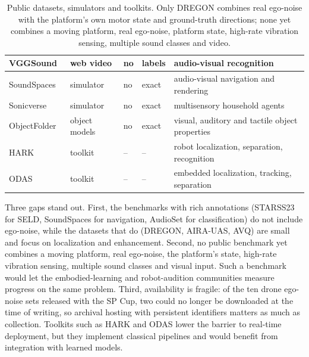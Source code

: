 \begin{table}[t]
\begin{tabular}{@{}L{3.1cm}L{2.0cm}L{1.3cm}L{1.4cm}L{7.6cm}@{}}
VGGSound~\cite{chen2020vggsound} & web video & no & labels & audio-visual recognition \\
\midrule
SoundSpaces~\cite{chen2020soundspaces,chen2022soundspaces2} & simulator & no & exact & audio-visual navigation and rendering \\
Sonicverse~\cite{gao2023sonicverse} & simulator & no & exact & multisensory household agents \\
ObjectFolder~\cite{gao2021objectfolder} & object models & no & exact & visual, auditory and tactile object properties \\
\midrule
HARK~\cite{nakadai2017hark} & toolkit & -- & -- & robot localization, separation, recognition \\
ODAS~\cite{grondin2022odas} & toolkit & -- & -- & embedded localization, tracking, separation \\
\bottomrule
\end{tabular}
\caption{Public datasets, simulators and toolkits. Only DREGON combines real ego-noise with the platform's own motor state and ground-truth directions; none yet combines a moving platform, real ego-noise, platform state, high-rate vibration sensing, multiple sound classes and video.}
\label{tab:datasets}
\end{table}

Three gaps stand out.
First, the benchmarks with rich annotations (STARSS23 for SELD, SoundSpaces for navigation, AudioSet for classification) do not include ego-noise, while the datasets that do (DREGON, AIRA-UAS, AVQ) are small and focus on localization and enhancement.
Second, no public benchmark yet combines a moving platform, real ego-noise, the platform's state, high-rate vibration sensing, multiple sound classes and visual input.
Such a benchmark would let the embodied-learning and robot-audition communities measure progress on the same problem.
Third, availability is fragile: of the ten drone ego-noise sets released with the SP Cup, two could no longer be downloaded at the time of writing, so archival hosting with persistent identifiers matters as much as collection.
Toolkits such as HARK and ODAS lower the barrier to real-time deployment, but they implement classical pipelines and would benefit from integration with learned models.
